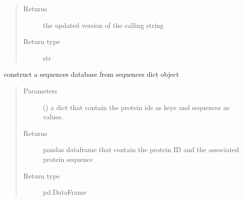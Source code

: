 \documentclass[letterpaper,10pt,english]{sphinxmanual}
\begin{document}
\begin{fulllineitems}
\begin{quote}
\begin{description}
\begin{itemize}
\end{itemize}

\item[{Returns}] \leavevmode
the updated version of the calling string

\item[{Return type}] \leavevmode
str

\end{description}\end{quote}

\end{fulllineitems}


\begin{fulllineitems}
\label{\detokenize{IPTK.Utils:IPTK.Utils.UtilityFunction.build_sequence_table}}
construct a sequences database from sequences dict object
\begin{quote}\begin{description}
\item[{Parameters}] \leavevmode
{} (\sphinxstyleliteralemphasis{\sphinxupquote{{[}}}\sphinxstyleliteralemphasis{\sphinxupquote{,}}\sphinxstyleliteralemphasis{\sphinxupquote{{]}}}) \textendash{} a dict that contain the protein ids as keys and sequences as values.

\item[{Returns}] \leavevmode
pandas dataframe that contain the protein ID and the associated protein sequence

\item[{Return type}] \leavevmode
pd.DataFrame

\end{description}\end{quote}

\end{fulllineitems}

\end{document}
